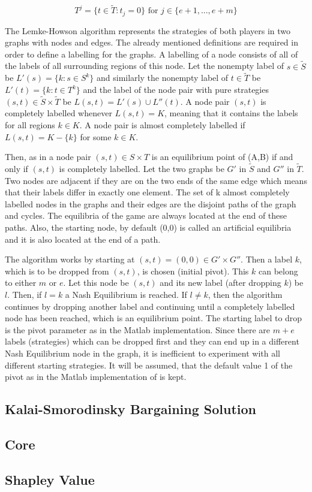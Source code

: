 \[
T^j = \{ t \in \tilde{T}: t_j = 0 \} \text{ for } j \in \{e+1,...,e+m\} 
\]

The Lemke-Howson algorithm represents the strategies of both players in two graphs with nodes and edges. The already mentioned definitions are required in order to define a labelling for the graphs. A labelling of a node consists of all of the labels of all surrounding regions of this node. Let the nonempty label of $s \in \tilde{S}$ be $L'(s) = \{ k: s \in S^k \}$ and similarly the nonempty label of $t \in \tilde{T}$ be $L'(t) = \{ k: t \in T^k \}$ and the label of the node pair with pure strategies $(s,t) \in \tilde{S} \times \tilde{T}$ be $L(s,t) = L'(s) \cup L''(t)$. A node pair $(s,t)$ is completely labelled whenever $L(s,t) = K$, meaning that it contains the labels for all regions $k \in K$. A node pair is almost completely labelled if $L(s,t) = K - \{k\}$ for some $k \in K$. 

Then, as in \citep{shapley1974note} a node pair $(s,t) \in S \times T$ is an equilibrium point of (A,B) if and only if $(s,t)$ is completely labelled. Let the two graphs be $G'$ in $\tilde{S}$ and $G''$ in $\tilde{T}$. Two nodes are adjacent if they are on the two ends of the same edge which means that their labels differ in exactly one element. The set of k almost completely labelled nodes in the graphs and their edges are the disjoint paths of the graph and cycles. The equilibria of the game are always located at the end of these paths. Also, the starting node, by default (0,0) is called an artificial equilibria and it is also located at the end of a path.

The algorithm works by starting at $(s,t) = (0,0) \in G' \times G'' $. Then a label $k$, which is to be dropped from $(s,t)$, is chosen (initial pivot). This $k$ can belong to either $m$ or $e$. Let this node be $(s,t)$ and its new label (after dropping $k$) be $l$. Then, if $l=k$ a Nash Equilibrium is reached. If $l\neq k$, then the algorithm continues by dropping another label and continuing until a completely labelled node has been reached, which is an equilibrium point. The starting label to drop is the pivot parameter as in the Matlab implementation. Since there are $m+e$ labels (strategies) which can be dropped first and they can end up in a different Nash Equilibrium node in the graph, it is inefficient to experiment with all different starting strategies. It will be assumed, that the default value 1 of the pivot as in the Matlab implementation of \citep{lemkeHowson2014Matlab} is kept.

\subsection{Kalai-Smorodinsky Bargaining Solution}

\subsection{Core}

\subsection{Shapley Value}

